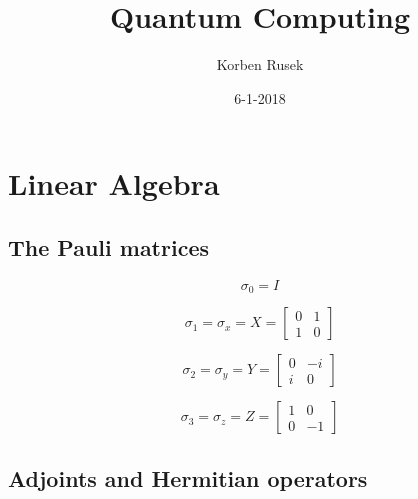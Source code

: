 \documentclass{article}
\author{Korben Rusek}
\title{Quantum Computing}
\date{6-1-2018}
\begin{document}
\maketitle
\newcommand{\gindex}[2]{|#1\!:\!#2|}
\newcommand{\lcm}{\textrm{lcm}}
\newcommand{\irr}{\textrm{irr}}
\newcommand{\sylp}{$Syl_{p}$}
\newcommand{\phnt}[1]{$\phantom{1}^{#1}$}
\newcommand{\gen}[1]{\langle#1\rangle}
\newcommand{\BN}{\mathbb{N}}
\newcommand{\BZ}{\mathbb{Z}}
\newcommand{\BQ}{\mathbb{Q}}
\newcommand{\BR}{\mathbb{R}}
\newcommand{\BC}{\mathbb{C}}
\newcommand{\BF}{\mathbb{F}}
\newcommand{\CF}{\mathcal{F}}
\newcommand{\CQ}{\mathcal{Q}}
\newcommand{\fa}{\mathfrak{a}}
\newcommand{\fb}{\mathfrak{b}}
\newcommand{\fp}{\mathfrak{p}}
\newcommand{\fq}{\mathfrak{q}}
\newcommand{\fm}{\mathfrak{m}}
\newcommand{\FN}{\mathfrak{N}}
\newcommand{\FR}{\mathfrak{R}}
\newcommand{\set}[1]{\{#1\}}
\newcommand{\trv}{\set{1}}
\newcommand{\Aut}{\mathrm{Aut}}
\newcommand{\End}{\mathrm{End}}
\newcommand{\Ker}{\mathrm{Ker}}
\newcommand{\chr}{\mathrm{char}}
\theoremstyle{definition}
\newtheorem{theorem}{Theorem}[section]
\newtheorem{definition}[theorem]{Definition}
\newtheorem{postulate}{Postulate}[section]

\section{Linear Algebra}

\setcounter{subsection}{2}
\subsection{The Pauli matrices}


\[
  \sigma_0=I
\]

\[
  \sigma_1=\sigma_x=X=
  \begin{bmatrix}
    0&1 \\
    1&0
  \end{bmatrix}
\]

\[
  \sigma_2=\sigma_y=Y=
  \begin{bmatrix}
    0&-i \\
    i&0
  \end{bmatrix}
\]

\[
  \sigma_3=\sigma_z=Z=
  \begin{bmatrix}
    1&0 \\
    0&-1
  \end{bmatrix}
\]

\setcounter{subsection}{5}
\subsection{Adjoints and Hermitian operators}
\end{document}
